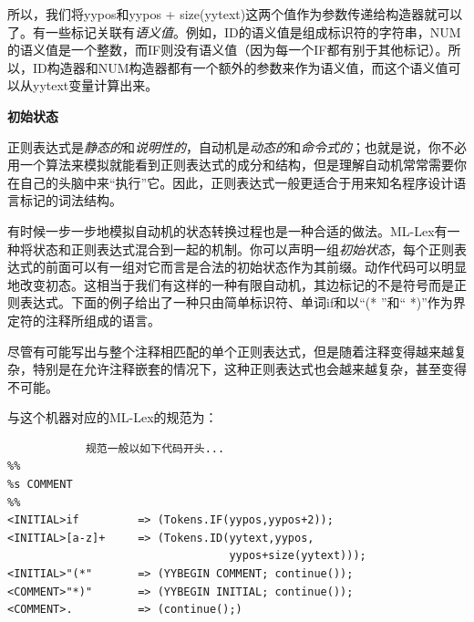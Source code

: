\documentclass[cn,11pt,chinese]{elegantbook}
\begin{document}
所以，我们将yypos和yypos + size(yytext)这两个值作为参数传递给构造器就可以了。有一些标记关联有\textit{语义值}。例如，ID的语义值是组成标识符的字符串，NUM的语义值是一个整数，而IF则没有语义值（因为每一个IF都有别于其他标记）。所以，ID构造器和NUM构造器都有一个额外的参数来作为语义值，而这个语义值可以从yytext变量计算出来。

\textbf{初始状态}

正则表达式是\textit{静态的}和\textit{说明性的}，自动机是\textit{动态的}和\textit{命令式的}；也就是说，你不必用一个算法来模拟就能看到正则表达式的成分和结构，但是理解自动机常常需要你在自己的头脑中来“执行”它。因此，正则表达式一般更适合于用来知名程序设计语言标记的词法结构。

有时候一步一步地模拟自动机的状态转换过程也是一种合适的做法。ML-Lex有一种将状态和正则表达式混合到一起的机制。你可以声明一组\textit{初始状态}，每个正则表达式的前面可以有一组对它而言是合法的初始状态作为其前缀。动作代码可以明显地改变初态。这相当于我们有这样的一种有限自动机，其边标记的不是符号而是正则表达式。下面的例子给出了一种只由简单标识符、单词if和以“(* ”和“ *)”作为界定符的注释所组成的语言。

\begin{figure}[htbp]
  \centering
\end{figure}

尽管有可能写出与整个注释相匹配的单个正则表达式，但是随着注释变得越来越复杂，特别是在允许注释嵌套的情况下，这种正则表达式也会越来越复杂，甚至变得不可能。

与这个机器对应的ML-Lex的规范为：

\begin{verbatim}
            规范一般以如下代码开头...
%%
%s COMMENT
%%
<INITIAL>if         => (Tokens.IF(yypos,yypos+2));
<INITIAL>[a-z]+     => (Tokens.ID(yytext,yypos,
                                  yypos+size(yytext)));
<INITIAL>"(*"       => (YYBEGIN COMMENT; continue());
<COMMENT>"*)"       => (YYBEGIN INITIAL; continue());
<COMMENT>.          => (continue();)
\end{verbatim}
\end{document}
